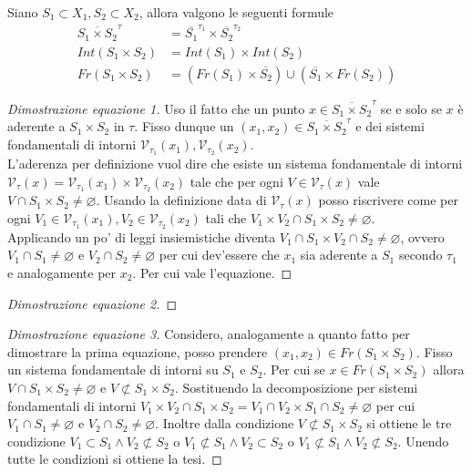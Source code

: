 \begin{theorem}
	Siano $S_1 \subset X_1, S_2 \subset X_2$, allora valgono le seguenti formule
	\begin{align}
		\overline{S_1\times S_2}^{\tau} & = \overline{S_1}^{\tau_1} \times \overline{S_2}^{\tau_2} \\
		Int(S_1 \times S_2) & = Int(S_1) \times Int(S_2)\\
		Fr(S_1 \times S_2) &= (Fr(S_1) \times \overline{S_2}) \cup (\overline{S_1} \times Fr(S_2))
	\end{align}
\end{theorem}
\begin{proof}[Dimostrazione equazione 1]
	Uso il fatto che un punto $x \in \overline{S_1\times S_2}^\tau$ se e solo se $x$ è aderente a $S_1 \times S_2$ in $\tau$. Fisso dunque un $(x_1, x_2) \in \overline{S_1\times S_2}^\tau$ e dei sistemi fondamentali di intorni $\mathcal{V}_{\tau_1}(x_1), \mathcal{V}_{\tau_2}(x_2)$.\\
	L'aderenza per definizione vuol dire che esiste un sistema fondamentale di intorni $\mathcal{V}_\tau(x) = \mathcal{V}_{\tau_1}(x_1) \times \mathcal{V}_{\tau_2}(x_2)$ tale che per ogni $V \in \mathcal{V}_\tau(x)$ vale $V \cap S_1 \times S_2 \neq \varnothing$. Usando la definizione data di $\mathcal{V}_\tau(x)$ posso riscrivere come per ogni $V_1 \in \mathcal{V}_{\tau_1}(x_1), V_2 \in \mathcal{V}_{\tau_2}(x_2)$ tali che $V_1 \times V_2 \cap S_1 \times S_2 \neq \varnothing$. \\
	Applicando un po' di leggi insiemistiche diventa $V_1 \cap S_1 \times V_2 \cap S_2 \neq \varnothing$, ovvero $V_1 \cap S_1 \neq \varnothing$ e $V_2 \cap S_2\neq \varnothing$ per cui dev'essere che $x_1$ sia aderente a $S_1$ secondo $\tau_1$ e analogamente per $x_2$. Per cui vale l'equazione. 
\end{proof}
\begin{proof}[Dimostrazione equazione 2]
\end{proof}
\begin{proof}[Dimostrazione equazione 3]
	Considero, analogamente a quanto fatto per dimostrare la prima equazione, posso prendere $(x_1,x_2) \in Fr(S_1 \times S_2)$. Fisso un sistema fondamentale di intorni su $S_1$ e $S_2$. Per cui se $x \in Fr(S_1 \times S_2)$ allora $V \cap S_1 \times S_2\neq \varnothing$ e $V \not\subset S_1 \times S_2$. Sostituendo la decomposizione per sistemi fondamentali di intorni $V_1 \times V_2 \cap S_1 \times S_2 = V_1 \cap V_2 \times S_1 \cap S_2\neq \varnothing$ per cui $V_1 \cap S_1 \neq \varnothing$ e $V_2 \cap S_2 \neq \varnothing$. Inoltre dalla condizione $V \not\subset S_1 \times S_2$ si ottiene le tre condizione $V_1 \subset S_1 \land V_2 \not\subset S_2$ o $V_1 \not\subset S_1 \land V_2 \subset S_2$ o $V_1 \not\subset S_1 \land V_2 \not\subset S_2$. Unendo tutte le condizioni si ottiene la tesi. 
\end{proof}

